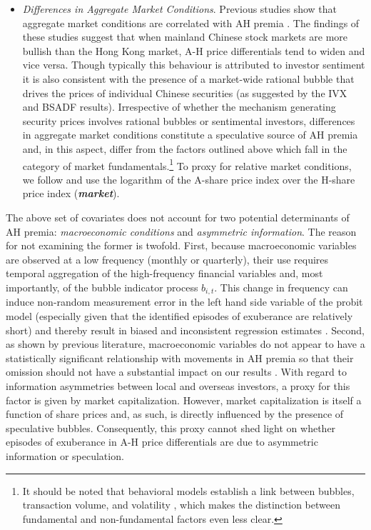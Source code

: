 \documentclass[11pt]{article}
\begin{document}
\begin{itemize}
\item \textit{Differences in Aggregate Market Conditions}. Previous studies show that aggregate market conditions are correlated with AH premia \citep{Ma1996,wangJ2004,chungHL2013}. The findings of these studies suggest that when mainland Chinese stock markets are more bullish than the Hong Kong market, A-H price differentials tend to widen and vice versa. Though typically this behaviour is attributed to investor sentiment \citep[see, e.g.,][and the references therein]{stambaughYY2012} it is also consistent with the presence of a market-wide rational bubble that drives the prices of individual Chinese securities (as suggested by the IVX and BSADF results). Irrespective of whether the mechanism generating security prices involves rational bubbles or sentimental investors, differences in aggregate market conditions constitute a speculative source of AH premia and, in this aspect, differ from the factors outlined above which fall in the category of market fundamentals.\footnote{It should be noted that behavioral models establish a link between bubbles, transaction volume, and volatility \citep{ScheinkmanX2003,scheinkman2014}, which makes the distinction between fundamental and non-fundamental factors even less clear.} To proxy for relative market conditions, we follow \citet{chungHL2013} and use the logarithm of the A-share price index over the H-share price index (\textit{\textbf{market}}). 

\end{itemize}

The above set of covariates does not account for two potential determinants of AH premia: \textit{macroeconomic conditions} and \textit{asymmetric information}. The reason for not examining the former is twofold. First, because macroeconomic variables are observed at a low frequency (monthly or quarterly), their use requires temporal aggregation of the high-frequency financial variables and, most importantly, of the bubble indicator process $b_{i,t}$. This change in frequency can induce non-random measurement error in the left hand side variable of the probit model (especially given that the identified episodes of exuberance are relatively short) and thereby result in biased and inconsistent regression estimates \citep{Hausman2001}. Second, as shown by previous literature, macroeconomic variables do not appear to have a statistically significant relationship with movements in AH premia so that their omission should not have a substantial impact on our results \citep{chungHL2013}. With regard to information asymmetries between local and overseas investors, a proxy for this factor is given by market capitalization. However, market capitalization is itself a function of share prices and, as such, is directly influenced by the presence of speculative bubbles. Consequently, this proxy cannot shed light on whether episodes of exuberance in A-H price differentials are due to asymmetric information or speculation.
\end{document}
